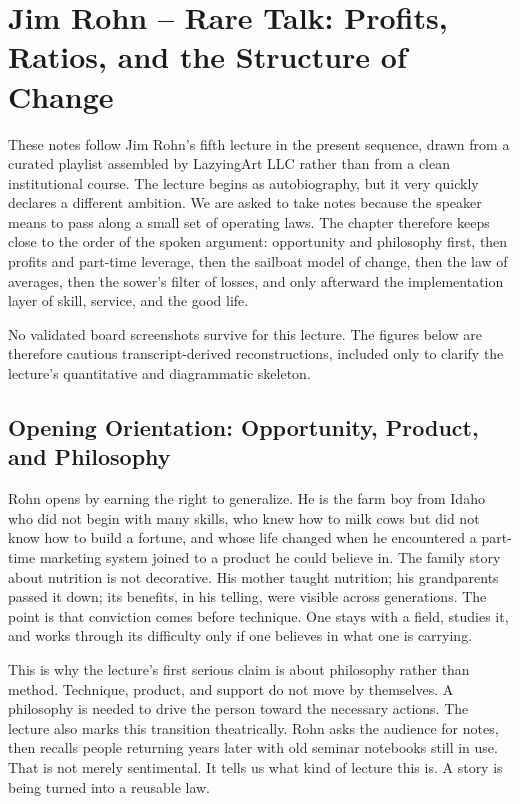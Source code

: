 \chapter{Jim Rohn -- Rare Talk: Profits, Ratios, and the Structure of Change}

These notes follow Jim Rohn's fifth lecture in the present sequence, drawn from a curated playlist assembled by LazyingArt LLC rather than from a clean institutional course. The lecture begins as autobiography, but it very quickly declares a different ambition. We are asked to take notes because the speaker means to pass along a small set of operating laws. The chapter therefore keeps close to the order of the spoken argument: opportunity and philosophy first, then profits and part-time leverage, then the sailboat model of change, then the law of averages, then the sower's filter of losses, and only afterward the implementation layer of skill, service, and the good life.

\begin{remark}
No validated board screenshots survive for this lecture. The figures below are therefore cautious transcript-derived reconstructions, included only to clarify the lecture's quantitative and diagrammatic skeleton.
\end{remark}

\section{Opening Orientation: Opportunity, Product, and Philosophy}

Rohn opens by earning the right to generalize. He is the farm boy from Idaho who did not begin with many skills, who knew how to milk cows but did not know how to build a fortune, and whose life changed when he encountered a part-time marketing system joined to a product he could believe in. The family story about nutrition is not decorative. His mother taught nutrition; his grandparents passed it down; its benefits, in his telling, were visible across generations. The point is that conviction comes before technique. One stays with a field, studies it, and works through its difficulty only if one believes in what one is carrying.

This is why the lecture's first serious claim is about philosophy rather than method. Technique, product, and support do not move by themselves. A philosophy is needed to drive the person toward the necessary actions. The lecture also marks this transition theatrically. Rohn asks the audience for notes, then recalls people returning years later with old seminar notebooks still in use. That is not merely sentimental. It tells us what kind of lecture this is. A story is being turned into a reusable law.


